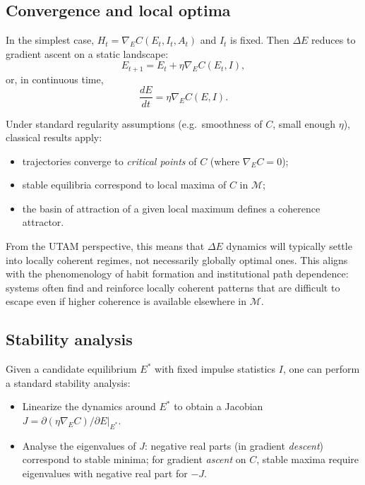 \documentclass[12pt,a4paper]{report}
\begin{document}
\subsection*{Convergence and local optima}

In the simplest case, \(H_t = \nabla_E C(E_t, I_t, A_t)\) and \(I_t\) is fixed. Then $\Delta E$ reduces to gradient ascent on a static landscape:
\[
    E_{t+1} = E_t + \eta \nabla_E C(E_t, I),
\]
or, in continuous time,
\[
    \frac{dE}{dt} = \eta \nabla_E C(E, I).
\]

Under standard regularity assumptions (e.g.\ smoothness of \(C\), small enough \(\eta\)), classical results apply:

\begin{itemize}[leftmargin=2em]
    \item trajectories converge to \emph{critical points} of \(C\) (where \(\nabla_E C = 0\));
    \item stable equilibria correspond to local maxima of \(C\) in \(\mathcal{M}\);
    \item the basin of attraction of a given local maximum defines a coherence attractor.
\end{itemize}

From the UTAM perspective, this means that $\Delta E$ dynamics will typically settle into locally coherent regimes, not necessarily globally optimal ones. This aligns with the phenomenology of habit formation and institutional path dependence: systems often find and reinforce locally coherent patterns that are difficult to escape even if higher coherence is available elsewhere in \(\mathcal{M}\).

\subsection*{Stability analysis}

Given a candidate equilibrium \(E^\ast\) with fixed impulse statistics \(I\), one can perform a standard stability analysis:

\begin{itemize}[leftmargin=2em]
    \item Linearize the dynamics around \(E^\ast\) to obtain a Jacobian \(J = \partial (\eta \nabla_E C)/\partial E \vert_{E^\ast}\).
    \item Analyse the eigenvalues of \(J\): negative real parts (in gradient \emph{descent}) correspond to stable minima; for gradient \emph{ascent} on \(C\), stable maxima require eigenvalues with negative real part for \(-J\).
\end{itemize}
\end{document}
